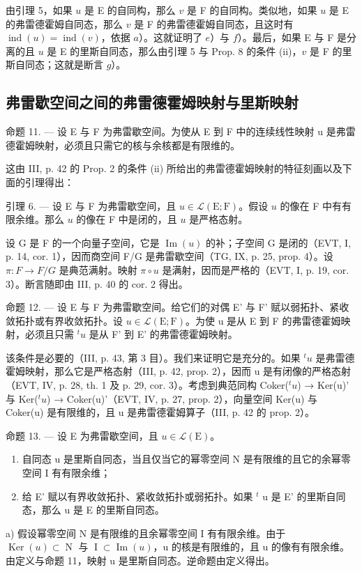 由引理 5，如果 \(u\) 是 E 的自同构，那么 \(v\) 是 F 的自同构。类似地，如果 \(u\) 是 E 的弗雷德霍姆自同态，那么 \(v\) 是 F 的弗雷德霍姆自同态，且这时有 \(\operatorname{ind}(u) = \operatorname{ind}(v)\)，依据 \(a\)）。这就证明了 \(e\)）与 \(f\)）。最后，如果 E 与 F 是分离的且 \(u\) 是 E 的里斯自同态，那么由引理 5 与 Prop. 8 的条件 (ii)，\(v\) 是 F 的里斯自同态；这就是断言 \(g\)）。

\subsection{弗雷歇空间之间的弗雷德霍姆映射与里斯映射}

命题 11. --- 设 E 与 F 为弗雷歇空间。为使从 E 到 F 中的连续线性映射 u 是弗雷德霍姆映射，必须且只需它的核与余核都是有限维的。

这由 III, p. 42 的 Prop. 2 的条件 (ii) 所给出的弗雷德霍姆映射的特征刻画以及下面的引理得出：

引理 6. --- 设 E 与 F 为弗雷歇空间，且 \(u \in \mathcal{L}(\mathrm{E};\mathrm{F})\)。假设 \(u\) 的像在 F 中有有限余维。那么 \(u\) 的像在 F 中是闭的，且 \(u\) 是严格态射。

设 G 是 F 的一个向量子空间，它是 \(\operatorname{Im}(u)\) 的补；子空间 G 是闭的（EVT, I, p. 14, cor. 1），因而商空间 F/G 是弗雷歇空间（TG, IX, p. 25, prop. 4）。设 \(\pi: F \to F/G\) 是典范满射。映射 \(\pi \circ u\) 是满射，因而是严格的（EVT, I, p. 19, cor. 3）。断言随即由 III, p. 40 的 cor. 2 得出。

命题 12. --- 设 E 与 F 为弗雷歇空间。给它们的对偶 E' 与 F' 赋以弱拓扑、紧收敛拓扑或有界收敛拓扑。设 \(u \in \mathcal{L}(\mathrm{E};\mathrm{F})\)。为使 u 是从 E 到 F 的弗雷德霍姆映射，必须且只需 \({}^{t}u\) 是从 F' 到 E' 的弗雷德霍姆映射。

该条件是必要的（III, p. 43, 第 3 目）。我们来证明它是充分的。如果 \(^{t}u\) 是弗雷德霍姆映射，那么它是严格态射（III, p. 42, prop. 2），因而 u 是有闭像的严格态射（EVT, IV, p. 28, th. 1 及 p. 29, cor. 3）。考虑到典范同构 Coker(\(^{t}u\)) → Ker(u)' 与 Ker(\(^{t}u\)) → Coker(u)'（EVT, IV, p. 27, prop. 2），向量空间 Ker(u) 与 Coker(u) 是有限维的，且 u 是弗雷德霍姆算子（III, p. 42 的 prop. 2）。

命题 13. --- 设 E 为弗雷歇空间，且 \(u \in \mathcal{L}(\mathrm{E})\)。

\begin{enumerate}
\def\labelenumi{\alph{enumi})}
\item
  自同态 u 是里斯自同态，当且仅当它的幂零空间 N 是有限维的且它的余幂零空间 I 有有限余维；
\item
 给 E' 赋以有界收敛拓扑、紧收敛拓扑或弱拓扑。如果 \(^{t}\) u 是 E' 的里斯自同态，那么 u 是 E 的里斯自同态。
\end{enumerate}
a) 假设幂零空间 N 是有限维的且余幂零空间 I 有有限余维。由于 \(\operatorname{Ker}(u) \subset \operatorname{N}\) 与 \(\operatorname{I} \subset \operatorname{Im}(u)\)，u 的核是有限维的，且 u 的像有有限余维。由定义与命题 11，映射 u 是里斯自同态。逆命题由定义得出。

